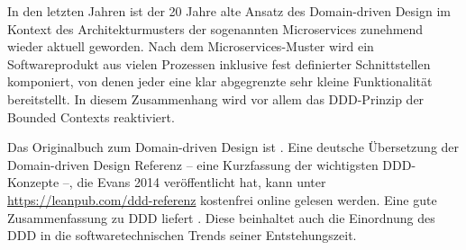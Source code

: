 In 
den letzten Jahren ist der 20 Jahre alte Ansatz des Domain-driven Design im Kontext des Architekturmusters der sogenannten 
Microservices zunehmend wieder aktuell geworden. Nach dem Microservices-Muster wird ein Softwareprodukt aus vielen Prozessen inklusive fest definierter Schnittstellen komponiert, von denen jeder eine klar abgegrenzte sehr kleine Funktionalität bereitstellt. In diesem Zusammenhang wird vor allem das DDD-Prinzip der Bounded Contexts reaktiviert.

Das 
Originalbuch zum Domain-driven Design ist \cite{eva03}. Eine deutsche Übersetzung der Domain-driven Design Referenz \cite{eva14} – eine Kurzfassung der wichtigsten DDD-Konzepte –, die Evans 2014 veröffentlicht hat, kann unter \url{https://leanpub.com/ddd-referenz} kostenfrei online gelesen werden. Eine gute Zusammenfassung zu DDD liefert \cite[136-157]{gol15}. Diese beinhaltet auch die Einordnung des DDD in die softwaretechnischen Trends seiner Entstehungszeit. 